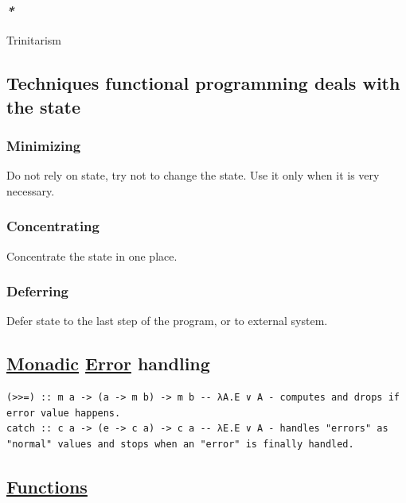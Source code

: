 \documentclass[11pt]{article}
\begin{document}
\subsubsection{\emph{*}}
\label{sec:orgce1a3b5}
\label{org4f6595c}Trinitarism\\

\subsection{Techniques functional programming deals with the state}
\label{sec:org48e09cd}

\subsubsection{Minimizing}
\label{sec:orga6c76ee}

Do not rely on state, try not to change the state. Use it only when it is very necessary.\\

\subsubsection{Concentrating}
\label{sec:org10b021b}

Concentrate the state in one place.\\

\subsubsection{Deferring}
\label{sec:org3bfad9b}

Defer state to the last step of the program, or to external system.\\

\subsection{\hyperref[org5cc37ea]{Monadic} \hyperref[orgb69b647]{Error} handling}
\label{sec:org72741ca}

\begin{verbatim}
(>>=) :: m a -> (a -> m b) -> m b -- λA.E ∨ A - computes and drops if error value happens.
catch :: c a -> (e -> c a) -> c a -- λE.E ∨ A - handles "errors" as "normal" values and stops when an "error" is finally handled.
\end{verbatim}

\subsection{\hyperref[org66c5288]{Functions}}
\label{sec:orgbb4e4d1}
\end{document}
